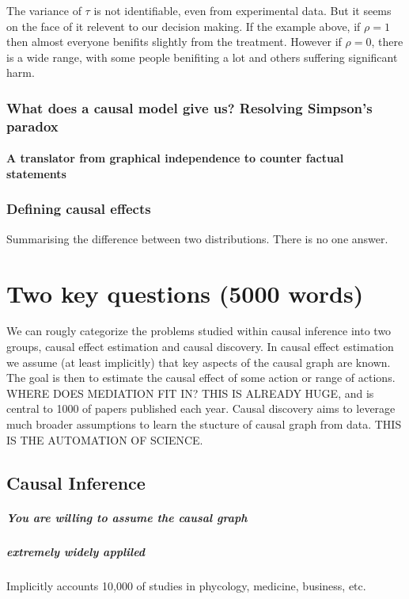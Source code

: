 \documentclass[11pt,a4paper,oneside]{book}
\begin{document}
The variance of $\tau$ is not identifiable, even from experimental data. But it seems on the face of it relevent to our decision making. If the example above, if $\rho = 1$ then almost everyone benifits slightly from the treatment. However if $\rho=0$, there is a wide range, with some people benifiting a lot and others suffering significant harm.  

\subsection*{What does a causal model give us? Resolving Simpson's paradox}

\subsubsection{A translator from graphical independence to counter factual statements}
\subsection*{Defining causal effects} Summarising the difference between two distributions. There is no one answer. \cite{Janzing2013}

\chapter*{Two key questions (5000 words)}

We can rougly categorize the problems studied within causal inference into two groups, causal effect estimation and causal discovery. In causal effect estimation we assume (at least implicitly) that key aspects of the causal graph are known. The goal is then to estimate the causal effect of some action or range of actions. WHERE DOES MEDIATION FIT IN? THIS IS ALREADY HUGE, and is central to 1000 of papers published each year. Causal discovery aims to leverage much broader assumptions to learn the stucture of causal graph from data. THIS IS THE AUTOMATION OF SCIENCE.

 
\section*{Causal Inference} 
\paragraph*{You are willing to assume the causal graph}
\paragraph*{extremely widely appliled} Implicitly accounts 10,000 of studies in phycology, medicine, business, etc. 
\end{document}
